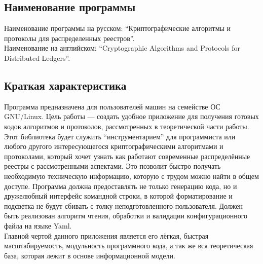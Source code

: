 \subsection{Наименование программы}
Наименование программы на русском:
``Криптографические алгоритмы и протоколы для распределенных реестров''. \\
Наименование на английском:
``Cryptographic Algorithms and Protocols for Distributed Ledgers''. \\


\subsection{Краткая характеристика}
Программа предназначена для пользователей машин на семействе ОС GNU/Linux.
Цель работы --- создать удобное приложение для получения готовых кодов
алгоритмов и протоколов, рассмотренных в теоретической части работы.  Этот
библиотека будет служить ``инструментарием'' для программиста или любого
другого интересующегося криптографическими алгоритмами и протоколами, который
хочет узнать как работают современные распределённые реестры с рассмотренными
аспектами. Это позволит быстро получать необходимую техническую информацию,
которую с трудом можно найти в общем доступе. Программа должна предоставлять не
только генерацию кода, но и дружелюбный интерфейс командной строки, в которой
форматирование и подсветка не будут сбивать с толку неподготовленного
пользователя. Должен быть реализован алгоритм чтения, обработки и валидации
конфигурационного файла на языке Yaml.\\

Главной чертой данного приложения является его лёгкая, быстрая
масштабируемость, модульность программного кода, а так же вся теоретическая
база, которая лежит в основе информационной модели.
